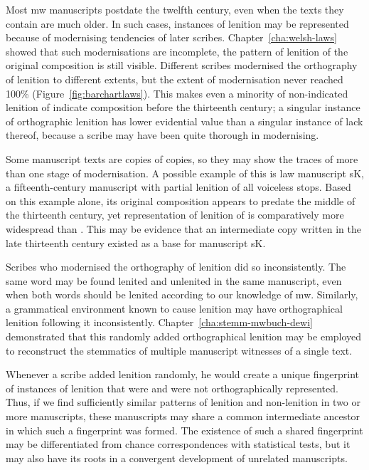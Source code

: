 Most \gls{mw} manuscripts postdate the twelfth century, even when the texts they contain are much older. In such cases, instances of lenition may be represented because of modernising tendencies of later scribes. Chapter~\ref{cha:welsh-laws} showed  that such modernisations are incomplete, \ie the pattern of lenition of the original composition is still visible. Different scribes  modernised the orthography of lenition to different extents, but the extent of modernisation never reached 100\% (Figure~\ref{fig:barchartlaws}). This makes even a minority of non-indicated lenition of  indicate composition before the thirteenth century; a singular instance of orthographic lenition has lower evidential value than a singular instance of lack thereof, because a scribe may have been quite thorough in modernising.

Some manuscript texts are copies of copies, so they may show the traces of more than one stage of modernisation. A possible example of this is law manuscript \gls{sK}, a fifteenth-century manuscript with partial lenition of all voiceless stops. Based on this example alone, its original composition appears to predate the middle of the thirteenth century, yet representation of lenition of  is comparatively more widespread than . This may be evidence that an intermediate copy written in the late thirteenth century existed as a base for manuscript \gls{sK}.

Scribes who modernised the orthography of lenition did so inconsistently. The same word may be found lenited and unlenited in the same manuscript, even when both words should be lenited according to our knowledge of \gls{mw}. Similarly, a grammatical environment known to cause lenition may have orthographical lenition following it inconsistently. Chapter~\ref{cha:stemm-mwbuch-dewi} demonstrated that this randomly added orthographical lenition may be employed to reconstruct the stemmatics of multiple manuscript witnesses of a single text.

Whenever a scribe added lenition randomly, he would create a unique fingerprint of instances of lenition that were and were not orthographically represented. Thus, if we find sufficiently similar patterns of lenition and non-lenition in two or more manuscripts, these manuscripts may share a common intermediate ancestor in which such a fingerprint was formed. The existence of such a shared fingerprint may be differentiated from chance correspondences with statistical tests, but it may also have its roots in a convergent development of  unrelated manuscripts.

